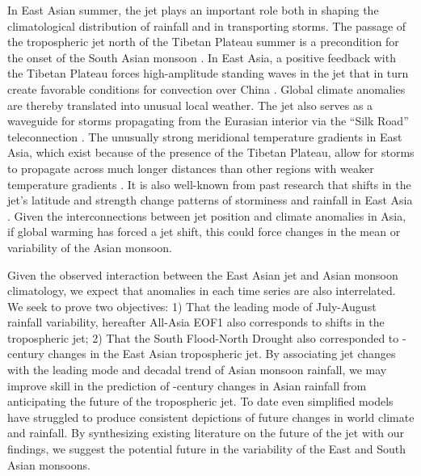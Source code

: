 	In East Asian summer, the jet plays an important role both in shaping the climatological distribution of rainfall and in transporting storms. The passage of the tropospheric jet north of the Tibetan Plateau summer is a precondition for the onset of the South Asian monsoon \citep{Yin1949,Yeh1959,Hahn1975}. In East Asia, a positive feedback with the Tibetan Plateau forces high-amplitude standing waves in the jet that in turn create favorable conditions for convection over China \citep{Yang2002,Molnar2010,Chen2015}. Global climate anomalies are thereby translated into unusual local weather\citep{Nigam1989,Broccoli1992,Park1997}. The jet also serves as a waveguide for storms propagating from the Eurasian interior via the ``Silk Road'' teleconnection \citep{Hoskins1993,Ambrizzi1997,Kosaka2012}. The unusually strong meridional temperature gradients in East Asia, which exist because of the presence of the Tibetan Plateau, allow for storms to propagate across much longer distances than other regions with weaker temperature gradients \citep{Branstator2002}. It is also well-known from past research that shifts in the jet's latitude and strength change patterns of storminess and rainfall in East Asia \citep{Liang1998,Branstator2002,Kwon2007,Du2009,Li2014}.  Given the interconnections between jet position and climate anomalies in Asia, if global warming has forced a jet shift, this could force changes in the mean or variability of the Asian monsoon.
		 
	Given the observed interaction between the East Asian jet and Asian monsoon climatology, we expect that anomalies in each time series are also interrelated. We seek to prove two objectives: 1) That the leading mode of July-August rainfall variability, hereafter All-Asia EOF1 \citep{Day2015} also corresponds to shifts in the tropospheric jet; 2) That the South Flood-North Drought also corresponded to -century changes in the East Asian tropospheric jet. By associating jet changes with the leading mode and decadal trend of Asian monsoon rainfall, we may improve skill in the prediction of -century changes in Asian rainfall from anticipating the future of the tropospheric jet. To date even simplified models have struggled to produce consistent depictions of future changes in world climate and rainfall. By synthesizing existing literature on the future of the jet with our findings, we suggest the potential future in the variability of the East and South Asian monsoons.
	  
